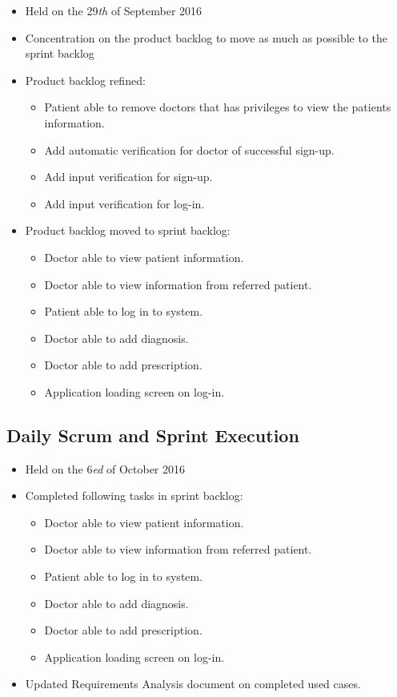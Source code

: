 \documentclass[a4paper]{article}
\begin{document}
\begin{itemize}
\item Held on the 29\textit{th} of September 2016
\item Concentration on the product backlog to move as much as possible to the sprint backlog
\item Product backlog refined:

\begin{itemize}
\item Patient able to remove doctors that has privileges to view the patients information.
\item Add automatic verification for doctor of successful sign-up.
\item Add input verification for sign-up.
\item Add input verification for log-in.
\end{itemize}

\item Product backlog moved to sprint backlog:

\begin{itemize}
\item Doctor able to view patient information.
\item Doctor able to view information from referred patient.
\item Patient able to log in to system.
\item Doctor able to add diagnosis.
\item Doctor able to add prescription.
\item Application loading screen on log-in.
\end{itemize}

\end{itemize}

\subsection{Daily Scrum and Sprint Execution}

\begin{itemize}
\item Held on the 6\textit{ed} of October 2016
\item Completed following tasks in sprint backlog:

\begin{itemize}
\item Doctor able to view patient information.
\item Doctor able to view information from referred patient.
\item Patient able to log in to system.
\item Doctor able to add diagnosis.
\item Doctor able to add prescription.
\item Application loading screen on log-in.
\end{itemize}

\item Updated Requirements Analysis document on completed used cases.

\end{itemize}
\end{document}
